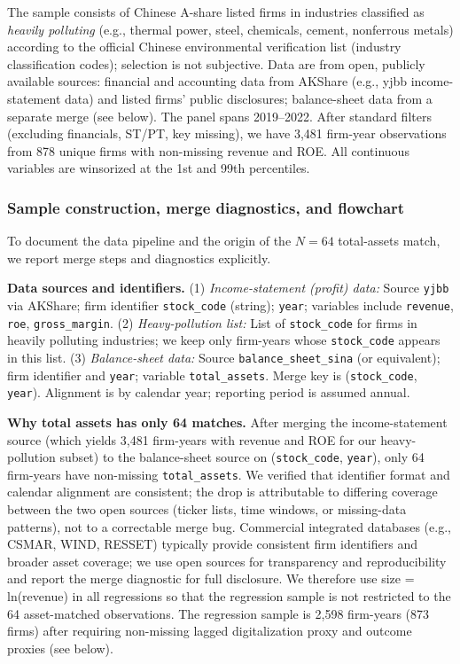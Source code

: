 The sample consists of Chinese A-share listed firms in industries classified as \emph{heavily polluting} (e.g., thermal power, steel, chemicals, cement, nonferrous metals) according to the official Chinese environmental verification list (industry classification codes); selection is not subjective. Data are from open, publicly available sources: financial and accounting data from AKShare (e.g., yjbb income-statement data) and listed firms' public disclosures; balance-sheet data from a separate merge (see below). The panel spans 2019--2022. After standard filters (excluding financials, ST/PT, key missing), we have 3,481 firm-year observations from 878 unique firms with non-missing revenue and ROE. All continuous variables are winsorized at the 1st and 99th percentiles.

\subsubsection{Sample construction, merge diagnostics, and flowchart}

To document the data pipeline and the origin of the $N = 64$ total-assets match, we report merge steps and diagnostics explicitly.

\textbf{Data sources and identifiers.} (1) \emph{Income-statement (profit) data:} Source \texttt{yjbb} via AKShare; firm identifier \texttt{stock\_code} (string); \texttt{year}; variables include \texttt{revenue}, \texttt{roe}, \texttt{gross\_margin}. (2) \emph{Heavy-pollution list:} List of \texttt{stock\_code} for firms in heavily polluting industries; we keep only firm-years whose \texttt{stock\_code} appears in this list. (3) \emph{Balance-sheet data:} Source \texttt{balance\_sheet\_sina} (or equivalent); firm identifier and \texttt{year}; variable \texttt{total\_assets}. Merge key is (\texttt{stock\_code}, \texttt{year}). Alignment is by calendar year; reporting period is assumed annual.

\textbf{Why total assets has only 64 matches.} After merging the income-statement source (which yields 3,481 firm-years with revenue and ROE for our heavy-pollution subset) to the balance-sheet source on (\texttt{stock\_code}, \texttt{year}), only 64 firm-years have non-missing \texttt{total\_assets}. We verified that identifier format and calendar alignment are consistent; the drop is attributable to differing coverage between the two open sources (ticker lists, time windows, or missing-data patterns), not to a correctable merge bug. Commercial integrated databases (e.g., CSMAR, WIND, RESSET) typically provide consistent firm identifiers and broader asset coverage; we use open sources for transparency and reproducibility and report the merge diagnostic for full disclosure. We therefore use size = ln(revenue) in all regressions so that the regression sample is not restricted to the 64 asset-matched observations. The regression sample is 2,598 firm-years (873 firms) after requiring non-missing lagged digitalization proxy and outcome proxies (see below).

